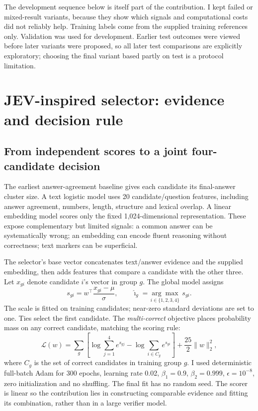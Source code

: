 \documentclass[10pt,a4paper]{article}
\begin{document}
The development sequence below is itself part of the contribution. I kept failed or mixed-result variants, because they show which signals and computational costs did not reliably help. Training labels come from the supplied training references only. Validation was used for development. Earlier test outcomes were viewed before later variants were proposed, so all later test comparisons are explicitly exploratory; choosing the final variant based partly on test is a protocol limitation.

\section{JEV-inspired selector: evidence and decision rule}
\subsection{From independent scores to a joint four-candidate decision}
The earliest answer-agreement baseline gives each candidate its final-answer cluster size. A text logistic model uses 20 candidate/question features, including answer agreement, numbers, length, structure and lexical overlap. A linear embedding model scores only the fixed 1,024-dimensional representation. These expose complementary but limited signals: a common answer can be systematically wrong; an embedding can encode fluent reasoning without correctness; text markers can be superficial.

The selector's base vector concatenates text/answer evidence and the supplied embedding, then adds features that compare a candidate with the other three. Let $x_{gi}$ denote candidate $i$'s vector in group $g$. The global model assigns
\begin{equation}
 s_{gi}=w^\top\frac{x_{gi}-\mu}{\sigma},\qquad
 \hat\imath_g=\underset{i\in\{1,2,3,4\}}{\arg\max}\;s_{gi}.
\end{equation}
The scale is fitted on training candidates; near-zero standard deviations are set to one. Ties select the first candidate. The \emph{multi-correct} objective places probability mass on any correct candidate, matching the scoring rule:
\begin{equation}
 \mathcal L(w)=\sum_g\left[\log\sum_{j=1}^{4}e^{s_{gj}}
 -\log\sum_{i\in C_g}e^{s_{gi}}\right]
 +\frac{25}{2}\lVert w\rVert_2^2,
\end{equation}
where $C_g$ is the set of correct candidates in training group $g$. I used deterministic full-batch Adam for 300 epochs, learning rate 0.02, $\beta_1=0.9$, $\beta_2=0.999$, $\epsilon=10^{-8}$, zero initialization and no shuffling. The final fit has no random seed. The scorer is linear so the contribution lies in constructing comparable evidence and fitting its combination, rather than in a large verifier model.
\end{document}
